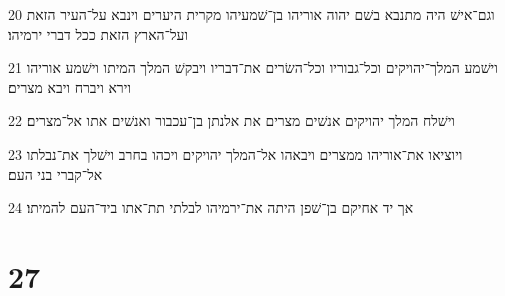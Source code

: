 \par 20 וגם־אישׁ היה מתנבא בשׁם יהוה אוריהו בן־שׁמעיהו מקרית היערים וינבא על־העיר הזאת ועל־הארץ הזאת ככל דברי ירמיהו׃
\par 21 וישׁמע המלך־יהויקים וכל־גבוריו וכל־השׂרים את־דבריו ויבקשׁ המלך המיתו וישׁמע אוריהו וירא ויברח ויבא מצרים׃
\par 22 וישׁלח המלך יהויקים אנשׁים מצרים את אלנתן בן־עכבור ואנשׁים אתו אל־מצרים׃
\par 23 ויוציאו את־אוריהו ממצרים ויבאהו אל־המלך יהויקים ויכהו בחרב וישׁלך את־נבלתו אל־קברי בני העם׃
\par 24 אך יד אחיקם בן־שׁפן היתה את־ירמיהו לבלתי תת־אתו ביד־העם להמיתו׃

\chapter{27}

